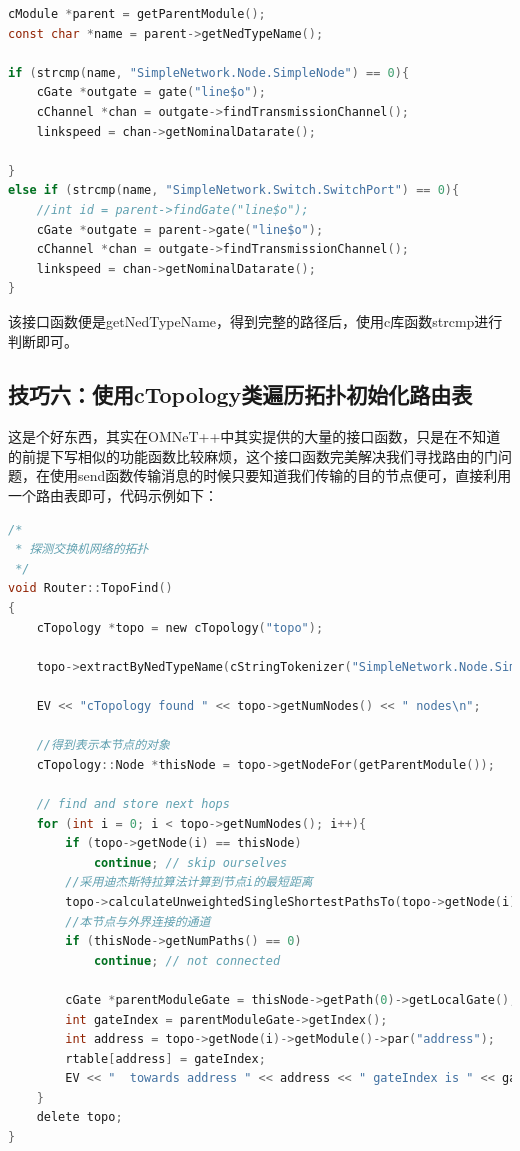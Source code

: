\begin{lstlisting}[language=c]
cModule *parent = getParentModule();
const char *name = parent->getNedTypeName();

if (strcmp(name, "SimpleNetwork.Node.SimpleNode") == 0){
    cGate *outgate = gate("line$o");
    cChannel *chan = outgate->findTransmissionChannel();
    linkspeed = chan->getNominalDatarate();

}
else if (strcmp(name, "SimpleNetwork.Switch.SwitchPort") == 0){
    //int id = parent->findGate("line$o");
    cGate *outgate = parent->gate("line$o");
    cChannel *chan = outgate->findTransmissionChannel();
    linkspeed = chan->getNominalDatarate();
}

\end{lstlisting}

该接口函数便是getNedTypeName，得到完整的路径后，使用c库函数strcmp进行判断即可。

\subsection{技巧六：使用cTopology类遍历拓扑初始化路由表}
\label{技巧六：使用ctopology类遍历拓扑初始化路由表}

这是个好东西，其实在OMNeT++中其实提供的大量的接口函数，只是在不知道的前提下写相似的功能函数比较麻烦，这个接口函数完美解决我们寻找路由的门问题，在使用send函数传输消息的时候只要知道我们传输的目的节点便可，直接利用一个路由表即可，代码示例如下：

\begin{lstlisting}[language=c]
/*
 * 探测交换机网络的拓扑
 */
void Router::TopoFind()
{
    cTopology *topo = new cTopology("topo");

    topo->extractByNedTypeName(cStringTokenizer("SimpleNetwork.Node.SimpleNode SimpleNetwork.Switch.SimpleSwitch").asVector());

    EV << "cTopology found " << topo->getNumNodes() << " nodes\n";

    //得到表示本节点的对象
    cTopology::Node *thisNode = topo->getNodeFor(getParentModule());

    // find and store next hops
    for (int i = 0; i < topo->getNumNodes(); i++){
        if (topo->getNode(i) == thisNode)
            continue; // skip ourselves
        //采用迪杰斯特拉算法计算到节点i的最短距离
        topo->calculateUnweightedSingleShortestPathsTo(topo->getNode(i));
        //本节点与外界连接的通道
        if (thisNode->getNumPaths() == 0)
            continue; // not connected

        cGate *parentModuleGate = thisNode->getPath(0)->getLocalGate();
        int gateIndex = parentModuleGate->getIndex();
        int address = topo->getNode(i)->getModule()->par("address");
        rtable[address] = gateIndex;
        EV << "  towards address " << address << " gateIndex is " << gateIndex  << endl;
    }
    delete topo;
}

\end{lstlisting}

